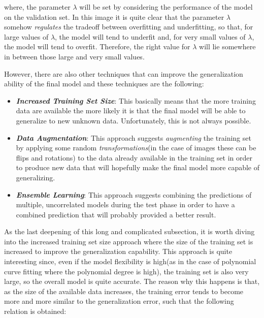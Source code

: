 where, the parameter $\lambda$ will be set by considering the performance of
the model on the validation set. In this image it is quite clear that the
parameter $\lambda$ somehow \emph{regulates} the tradeoff between overfitting
and underfitting, so that, for large values of $\lambda$, the model will tend
to underfit and, for very small values of $\lambda$, the model will tend to overfit.
Therefore, the right value for $\lambda$ will lie somewhere in between those
large and very small values.

However, there are also other techniques that can improve the generalization
ability of the final model and these techniques are the following:

\begin{itemize}
      \item \emph{\textbf{Increased Training Set Size}}: This basically means
            that the more training data are available the more likely it is that
            the final model will be able to generalize to new unknown data.
            Unfortunately, this is not always possible.
      \item \emph{\textbf{Data Augmentation}}: This approach suggests
            \emph{augmenting} the training set by applying some random
            \emph{transformations}(in the case of images these can be flips
            and rotations) to the data already available in the training set
            in order to produce new data that will hopefully make the final
            model more capable of generalizing.
      \item \emph{\textbf{Ensemble Learning}}: This approach suggests
            combining the predictions of multiple, uncorrelated models
            during the test phase in order to have a combined prediction
            that will probably provided a better result.
\end{itemize}

As the last deepening of this long and complicated subsection, it is worth
diving into the increased training set size approach where the size of the
training set is increased to improve the generalization capability. This
approach is quite interesting since, even if the model flexibility is
high(as in the case of polynomial curve fitting where the polynomial degree
is high), the training set is also very large, so the overall model is quite
accurate. The reason why this happens is that, as the size of the available
data increases, the training error tends to become more and more similar to
the generalization error, such that the following relation is obtained:

